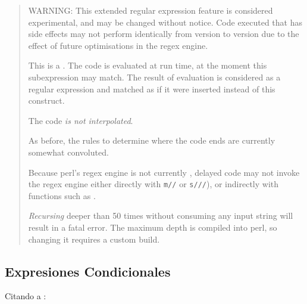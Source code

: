 \begin{it}\begin{quote}
WARNING: This extended regular expression feature is considered
experimental, and may be changed without notice. Code executed that has
side effects may not perform identically from version to version due to
the effect of future optimisations in the regex engine.

This is a . The code is evaluated at
run time, at the moment this subexpression may match. The result of
evaluation is considered as a regular expression and matched as if it
were inserted instead of this construct. 

The code {\it is not interpolated}. 

As before, the rules to determine where the code ends are currently somewhat convoluted.

Because perl's regex engine is not currently , delayed code
may not invoke the regex engine either directly with \verb|m//| or \verb|s///|),
or indirectly with functions such as .

{\it Recursing} deeper than 50 times without consuming any input string will
result in a fatal error. The maximum depth is compiled into perl, so
changing it requires a custom build.
\end{quote}\end{it}

\subsection{Expresiones Condicionales}
\label{subsection:regexpcondicionales}

Citando a :


